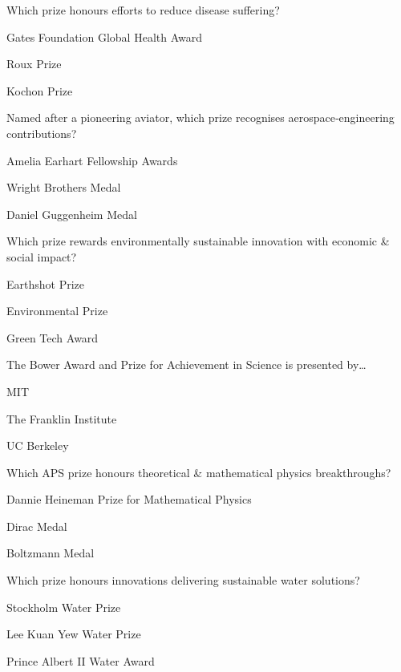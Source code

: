 \begin{enhancedmcq}{Which prize honours efforts to reduce disease suffering?}
\item Gates Foundation Global Health Award
\item Roux Prize
\item Kochon Prize

\end{enhancedmcq}
\begin{enhancedmcq}{Named after a pioneering aviator, which prize recognises aerospace‑engineering contributions?}
\item Amelia Earhart Fellowship Awards
\item Wright Brothers Medal
\item Daniel Guggenheim Medal

\end{enhancedmcq}
\begin{enhancedmcq}{Which prize rewards environmentally sustainable innovation with economic & social impact?}
\item Earthshot Prize
\item Environmental Prize
\item Green Tech Award

\end{enhancedmcq}
\begin{enhancedmcq}{The Bower Award and Prize for Achievement in Science is presented by…}
\item MIT
\item The Franklin Institute
\item UC Berkeley

\end{enhancedmcq}
\begin{enhancedmcq}{Which APS prize honours theoretical & mathematical physics breakthroughs?}
\item Dannie Heineman Prize for Mathematical Physics
\item Dirac Medal
\item Boltzmann Medal

\end{enhancedmcq}
\begin{enhancedmcq}{Which prize honours innovations delivering sustainable water solutions?}
\item Stockholm Water Prize
\item Lee Kuan Yew Water Prize
\item Prince Albert II Water Award

\end{enhancedmcq}
